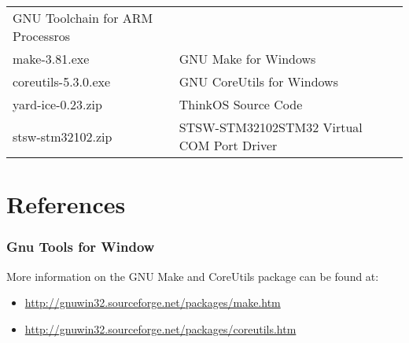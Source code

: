 \begin{longtable}[]{@{}ll@{}}
\begin{minipage}[t]{0.47\columnwidth}
{GNU Toolchain for ARM Processros}\strut
\end{minipage}\tabularnewline
\begin{minipage}[t]{0.47\columnwidth}\raggedright\strut
{make-3.81.exe}\strut
\end{minipage} & \begin{minipage}[t]{0.47\columnwidth}\raggedright\strut
{GNU Make for Windows}\strut
\end{minipage}\tabularnewline
\begin{minipage}[t]{0.47\columnwidth}\raggedright\strut
{coreutils-5.3.0.exe}\strut
\end{minipage} & \begin{minipage}[t]{0.47\columnwidth}\raggedright\strut
{GNU CoreUtils for Windows}\strut
\end{minipage}\tabularnewline
\begin{minipage}[t]{0.47\columnwidth}\raggedright\strut
{yard-ice-0.23.zip}\strut
\end{minipage} & \begin{minipage}[t]{0.47\columnwidth}\raggedright\strut
{ThinkOS Source Code}\strut
\end{minipage}\tabularnewline
\begin{minipage}[t]{0.47\columnwidth}\raggedright\strut
{stsw-stm32102.zip}\strut
\end{minipage} & \begin{minipage}[t]{0.47\columnwidth}\raggedright\strut
{STSW-STM32102STM32 Virtual COM Port Driver}\strut
\end{minipage}\tabularnewline
\bottomrule
\end{longtable}

\section{\texorpdfstring{{References}}{References}}\label{references}

\subsubsection{\texorpdfstring{{Gnu Tools for
Window}}{Gnu Tools for Window}}\label{gnu-tools-for-window}

{More information on the GNU Make and CoreUtils package can be found at:
}

\begin{itemize}
\tightlist
\item
  {\href{https://www.google.com/url?q=http://gnuwin32.sourceforge.net/packages/make.htm\&sa=D\&ust=1511275046397000\&usg=AFQjCNHQhDY13EJKv3bQUa54ST0nRARnLg}{http://gnuwin32.sourceforge.net/packages/make.htm}}
\item
  {\href{https://www.google.com/url?q=http://gnuwin32.sourceforge.net/packages/coreutils.htm\&sa=D\&ust=1511275046397000\&usg=AFQjCNHzCBMuNsNxheAyqUiqalsOFlTK9g}{http://gnuwin32.sourceforge.net/packages/coreutils.htm}}
\end{itemize}

